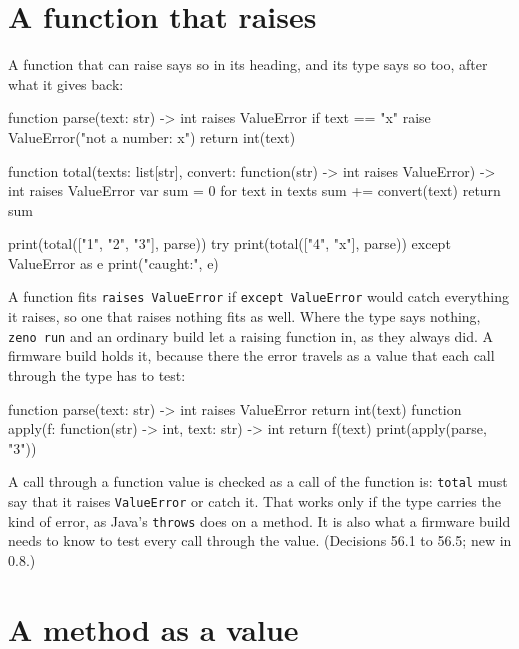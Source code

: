 \section{A function that raises}

A function that can raise says so in its heading, and its type says so
too, after what it gives back:

\begin{zeno}
function parse(text: str) -> int raises ValueError {
    if text == "x" {
        raise ValueError("not a number: x")
    }
    return int(text)
}

function total(texts: list[str], convert: function(str) -> int raises ValueError) -> int raises ValueError {
    var sum = 0
    for text in texts {
        sum += convert(text)
    }
    return sum
}

print(total(["1", "2", "3"], parse))
try {
    print(total(["4", "x"], parse))
} except ValueError as e {
    print("caught:", e)
}
\end{zeno}

A function fits \verb|raises ValueError| if \verb|except ValueError|
would catch everything it raises, so one that raises nothing fits as
well. Where the type says nothing, \verb|zeno run| and an ordinary
build let a raising function in, as they always did. A firmware build
holds it, because there the error travels as a value that each call
through the type has to test:

\begin{zeno}[file=apply.zeno, cmd=zeno build --firmware {file}, fails=yes]
function parse(text: str) -> int raises ValueError {
    return int(text)
}
function apply(f: function(str) -> int, text: str) -> int {
    return f(text)
}
print(apply(parse, "3"))
\end{zeno}

\begin{why}
A call through a function value is checked as a call of the function
is: \verb|total| must say that it raises \verb|ValueError| or catch it.
That works only if the type carries the kind of error, as Java's
\verb|throws| does on a method. It is also what a firmware build needs
to know to test every call through the value. (Decisions 56.1 to
56.5; new in 0.8.)
\end{why}

\section{A method as a value}

